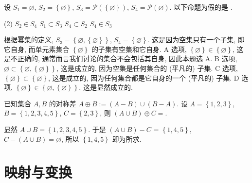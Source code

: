 \documentclass[10pt,UTF8]{book} %
\begin{document}
\begin{example}
    设 $S_1 = \varnothing$, $S_2 = \left\{ \varnothing \right\}$,
    $S_3 = \mathcal{P}(\left\{ \varnothing \right\})$,
    $S_4 = \mathcal{P}(\varnothing)$.
    以下命题为假的是 \underline{\qquad \qquad \qquad}.
    \begin{tasks}[label={\Alph*.}](2)
        \task $S_2 \in S_4$
        \task $S_1 \subset S_3$
        \task $S_4 \subset S_2$
        \task $S_4 \in S_3$
    \end{tasks}
    \begin{cmt}
        根据幂集的定义, $S_3 = \left\{ \varnothing, \left\{ \varnothing \right\} \right\}$,
        $S_4 = \left\{\varnothing\right\}$.
        这是因为空集只有一个子集, 即它自身, 而单元素集合 $\left\{ \varnothing \right\}$
        的子集有空集和它自身.
        \newline A 选项, $\left\{ \varnothing \right\} \in \left\{\varnothing\right\}$,
        这是不正确的, 通常而言我们讨论的集合不会包括其自身, 因此本题选 A.
        \newline B 选项, $\varnothing \subset \left\{ \varnothing, \left\{
            \varnothing
        \right\} \right\}$, 这是成立的, 因为空集是任何集合的 (平凡的) 子集.
        \newline C 选项, $\left\{ \varnothing \right\} \subset \left\{ \varnothing \right\}$,
        这是成立的, 因为任何集合都是它自身的一个 (平凡的) 子集.
        \newline D 选项, $\left\{ \varnothing \right\} \in \left\{ \varnothing, \left\{
            \varnothing
        \right\} \right\}$, 这是显然成立的.
    \end{cmt}
\end{example}

\begin{example}
    已知集合 $A, B$ 的对称差 $A \oplus B := (A - B) \cup (B - A)$.
    设 $A = \left\{ 1,2,3 \right\}$, $B = \left\{ 1,2,3,4,5 \right\}$,
    $C = \left\{2,3\right\}$, 则 $(A \cup B) \oplus C = $\underline{\qquad \qquad \qquad}.
    \begin{cmt}
        显然 $A \cup B = \left\{ 1,2,3,4,5 \right\}$.
        于是 $(A \cup B) - C$ = $\left\{ 1,4,5 \right\}$,
        $C - (A \cup B) = \varnothing$,
        所以 $\left\{ 1,4,5 \right\}$ 即为所求.
    \end{cmt}
\end{example}

\section{映射与变换}
\end{document}
